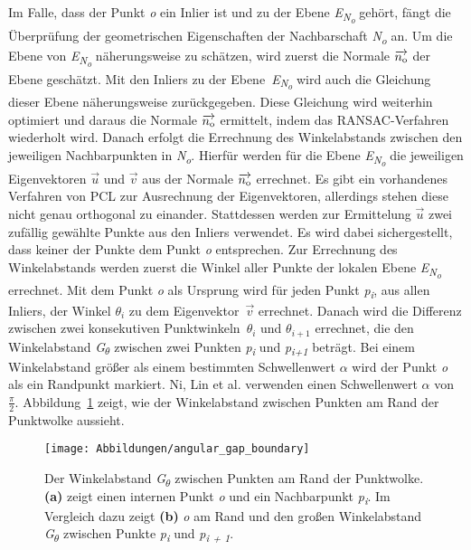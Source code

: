 Im Falle, dass der Punkt \textit{o} ein Inlier ist und zu der Ebene \textit{E\textsubscript{N\textsubscript{o}}} gehört, fängt die Überprüfung der geometrischen Eigenschaften der Nachbarschaft \textit{N\textsubscript{o}} an. Um die Ebene von \textit{E\textsubscript{N\textsubscript{o}}} näherungsweise zu schätzen, wird zuerst die Normale \textit{$\overrightarrow{n\textsubscript{o}}$} der Ebene geschätzt. Mit den Inliers zu der Ebene~\textit{E\textsubscript{N\textsubscript{o}}} wird auch die Gleichung dieser Ebene näherungsweise zurückgegeben. Diese Gleichung wird weiterhin optimiert und daraus die Normale \textit{$\overrightarrow{n\textsubscript{o}}$} ermittelt, indem das RANSAC-Verfahren wiederholt wird. Danach erfolgt die Errechnung des Winkelabstands zwischen den jeweiligen Nachbarpunkten in \textit{N\textsubscript{o}}. Hierfür werden für die Ebene \textit{E\textsubscript{N\textsubscript{o}}} die jeweiligen Eigenvektoren $\vec{u}$ und $\vec{v}$ aus der Normale $\overrightarrow{n\textsubscript{o}}$ errechnet. Es gibt ein vorhandenes Verfahren von PCL zur Ausrechnung der Eigenvektoren, allerdings stehen diese nicht genau orthogonal zu einander. Stattdessen werden zur Ermittelung \textit{$\vec{u}$} zwei zufällig gewählte Punkte aus den Inliers verwendet. Es wird dabei sichergestellt, dass keiner der Punkte dem Punkt \textit{o} entsprechen. Zur Errechnung des Winkelabstands werden zuerst die Winkel aller Punkte der lokalen Ebene \textit{E\textsubscript{N\textsubscript{o}}} errechnet. Mit dem Punkt \textit{o} als Ursprung wird für jeden Punkt \textit{p\textsubscript{i}}, aus allen Inliers, der Winkel \textit{$\theta_i$} zu dem Eigenvektor~$\vec{v}$ errechnet. Danach wird die Differenz zwischen zwei konsekutiven Punktwinkeln~$\theta_i$ und $\theta_{i+1}$ errechnet, die den Winkelabstand \textit{G\textsubscript{$\theta$}} zwischen zwei Punkten \textendash{} \textit{p\textsubscript{i}} und \textit{p\textsubscript{i+1}} \textendash{} beträgt. Bei einem Winkelabstand größer als einem bestimmten Schwellenwert $\alpha$ wird der Punkt \textit{o} als ein Randpunkt markiert. Ni, Lin et al. verwenden einen Schwellenwert $\alpha$ von $\frac{\pi}{2}$. Abbildung~\ref{edge_boundary} zeigt, wie der Winkelabstand zwischen Punkten am Rand der Punktwolke aussieht.

\begin{figure}[t]
	\texttt{[image: Abbildungen/angular\_gap\_boundary]}
	\centering
	\caption[Visualisierung des Winkelabstandes zwischen Punkten]{Der Winkelabstand \textit{G\textsubscript{$\theta$}} zwischen Punkten am Rand der Punktwolke. \textbf{(a)} zeigt einen internen Punkt \textit{o} und ein Nachbarpunkt \textit{p\textsubscript{i}}. Im Vergleich dazu zeigt \textbf{(b)} \textit{o} am Rand und den großen Winkelabstand \textit{G\textsubscript{$\theta$}} zwischen Punkte \textit{p\textsubscript{i}} und \textit{p\textsubscript{i + 1}}. \autocite{ni_edge_2016}}
	\label{edge_boundary}
\end{figure}

